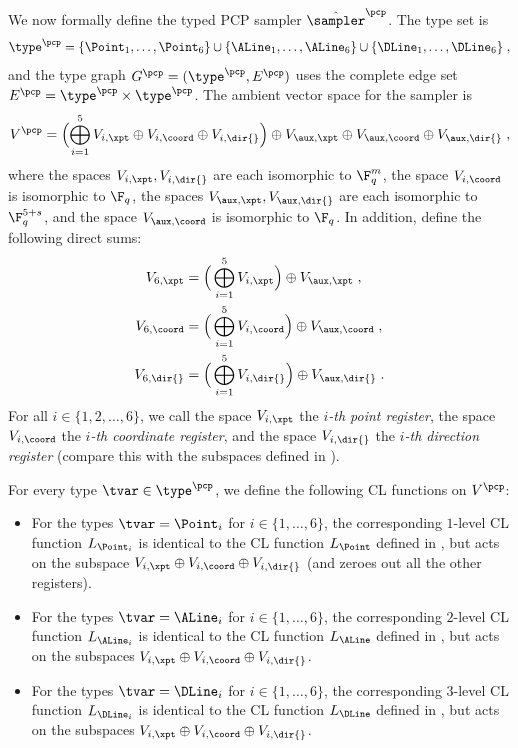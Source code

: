 We now formally define the typed PCP sampler $\tspcp$. The type set is
\begin{equation*}
  \type^\pcp = \{ \Point_1, \ldots,\Point_6\} \cup \{\ALine_1,
  \dots, \ALine_6\} \cup \{\DLine_1,
  \dots, \DLine_6\}\;,
\end{equation*}
and the type graph $G^\pcp=(\type^\pcp,E^\pcp)$ uses the complete edge set
$E^\pcp = \type^\pcp \times \type^\pcp$.
The ambient vector space for the sampler is
\begin{equation}
  \label{eq:V-pcp}
  V^\pcp = \Bigl( \bigoplus_{i=1}^{5} V_{i, \xpt} \oplus V_{i, \coord} \oplus
  V_{i, \dir{}}\Bigr) \oplus V_{\aux, \xpt} \oplus V_{\aux, \coord} \oplus
  V_{\aux, \dir{}}\;,
\end{equation}
where the spaces $V_{i,\xpt}, V_{i, \dir{}}$ are each isomorphic to $\F_q^m$,
the space $V_{i, \coord}$ is isomorphic to $\F_{q}$, the spaces $V_{\aux, \xpt},
V_{\aux, \dir{}}$ are each isomorphic to $\F_q^{5+s}$, and the space $V_{\aux,
  \coord}$ is isomorphic to $\F_q$.
In addition, define the following direct sums:
\begin{align*}
  V_{6, \xpt} & = \Big( \bigoplus_{i=1}^{5} V_{i, \xpt} \Big) \oplus V_{\aux, \xpt}\;,\\
  V_{6, \coord} & = \Big( \bigoplus_{i=1}^{5} V_{i, \coord} \Big) \oplus
                   V_{\aux, \coord}\;,\\
  V_{6, \dir{}} & = \Big( \bigoplus_{i=1}^{5} V_{i, \dir{}} \Big) \oplus
                   V_{\aux, \dir{}}\;.
\end{align*}
For all $i \in \{1,2,\ldots,6\}$, we call the space $V_{i,\xpt}$ the
\emph{$i$-th point register}, the space $V_{i,\coord}$ the \emph{$i$-th
  coordinate register}, and the space $V_{i,\dir{}}$ the \emph{$i$-th direction
  register} (compare this with the subspaces defined in ).

For every type $\tvar \in \type^\pcp$, we define the following CL functions on
$V^\pcp$:
\begin{itemize}
\item For the types $\tvar = \Point_i$ for $i \in \{1, \dots, 6\}$, the
  corresponding $1$-level CL function $L_{\Point_i}$ is identical to the CL
  function $L_\Point$ defined in , but acts on the
  subspace $V_{i,\xpt} \oplus V_{i, \coord} \oplus V_{i,
    \dir{}}$ (and zeroes out all the other registers).

\item For the types $\tvar = \ALine_i$ for $i \in \{ 1, \dots, 6\}$, the
  corresponding $2$-level CL function $L_{\ALine_i}$ is identical to the CL
  function $L_\ALine$ defined in , but acts on the subspaces
  $V_{i,\xpt} \oplus V_{i,\coord} \oplus V_{i,\dir{}}$.
  
\item For the types $\tvar = \DLine_i$ for $i \in \{ 1, \dots, 6\}$, the
  corresponding $3$-level CL function $L_{\DLine_i}$ is identical to the CL
  function $L_\DLine$ defined in , but acts on the subspaces
  $V_{i,\xpt} \oplus V_{i,\coord} \oplus V_{i,\dir{}}$.
\end{itemize}

